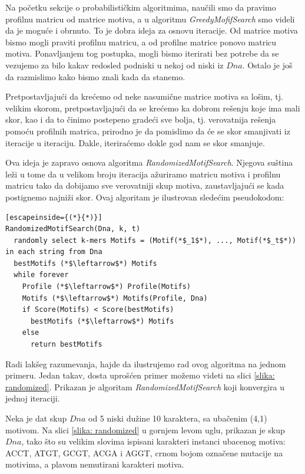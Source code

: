 Na početku sekcije o probabilističkim algoritmima, naučili smo da pravimo profilnu matricu od matrice motiva, a u algoritmu \textit{GreedyMofifSearch} smo videli da je moguće i obrnuto. To je dobra ideja za osnovu iteracije. Od matrice motiva bismo mogli praviti profilnu matricu, a od profilne matrice ponovo matricu motiva. Ponavljanjem tog postupka, mogli bismo iterirati bez potrebe da se vezujemo za bilo kakav redosled podniski u nekoj od niski iz $Dna$. Ostalo je još da razmislimo kako bismo znali kada da stanemo. 

Pretpostavljajući da krećemo od neke nasumične matrice motiva sa lošim, tj. velikim skorom, pretpostavljajući da se krećemo ka dobrom rešenju koje ima mali skor, kao i da to činimo postepeno gradeći sve bolja, tj. verovatnija rešenja pomoću profilnih matrica, prirodno je da pomislimo da će se skor smanjivati iz iteracije u iteraciju. Dakle, iteriraćemo dokle god nam se skor smanjuje.

Ova ideja je zapravo osnova algoritma \textit{RandomizedMotifSearch}. Njegova suština leži u tome da u velikom broju iteracija ažuriramo matricu motiva i profilnu matricu tako da dobijamo sve verovatniji skup motiva, zaustavljajući se kada postignemo najniži skor. Ovaj algoritam je ilustrovan sledećim pseudokodom:

\begin{lstlisting}[escapeinside={(*}{*)}]
RandomizedMotifSearch(Dna, k, t)
  randomly select k-mers Motifs = (Motif(*$_1$*), ..., Motif(*$_t$*)) in each string from Dna
  bestMotifs (*$\leftarrow$*) Motifs
  while forever
    Profile (*$\leftarrow$*) Profile(Motifs)
    Motifs (*$\leftarrow$*) Motifs(Profile, Dna)
    if Score(Motifs) < Score(bestMotifs)
      bestMotifs (*$\leftarrow$*) Motifs
    else 
      return bestMotifs
\end{lstlisting}

Radi lakšeg razumevanja, hajde da ilustrujemo rad ovog algoritma na jednom primeru. Jedan takav, dosta uprošćen primer možemo videti na slici \ref{slika: randomized}. Prikazan je algoritam \textit{RandomizedMotifSearch} koji konvergira u jednoj iteraciji.

Neka je dat skup $Dna$ od 5 niski dužine 10 karaktera, sa ubačenim (4,1) motivom. Na slici \ref{slika: randomized} u gornjem levom uglu, prikazan je skup $Dna$, tako što su velikim slovima ispisani karakteri instanci ubacenog motiva: ACCT, ATGT, GCGT, ACGA i AGGT, crnom bojom označene mutacije na motivima, a plavom nemutirani karakteri motiva. 

